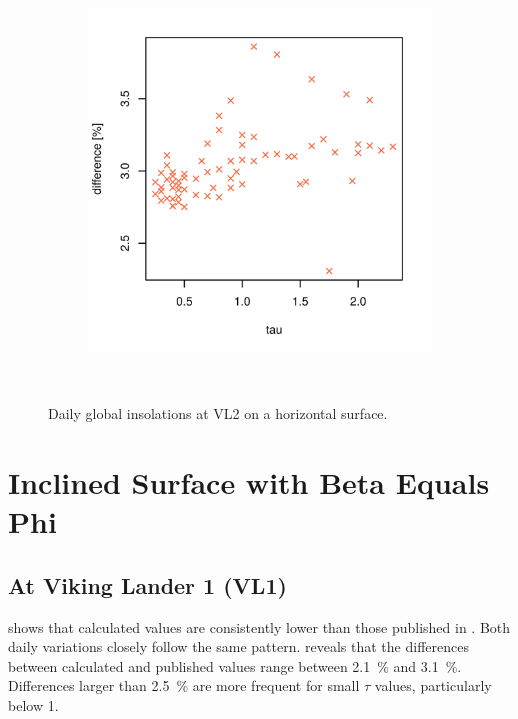 \begin{figure}[h]
\begin{subfigure}[t]{\subfigureWidth}
            \includegraphics[height=\graphicsHeight]{sections/appendix/insolation-calculation-verification/plots/hh-diff-bet-exp-calc-at-vl2.png}
            \label{fig:sub:comparative-global-insolation-at-vl2-horizontal-percentage-differences}
    \end{subfigure}\\[0.8ex]
    \caption[Daily global insolations at Viking Lander 2 on a horizontal surface]
    {Daily global insolations at \ac{VL2} on a horizontal surface.}
    \label{fig:plot:comparative-global-insolation-at-vl2-horizontal}
\vspace{-2ex}
\end{figure}

\section{Inclined Surface with Beta Equals Phi}
\subsection{At Viking Lander 1 (VL1)}
 shows that calculated values are consistently lower than those published in . Both daily variations closely follow the same pattern.  reveals that the differences between calculated and published values range between \SI{2.1}{\percent} and \SI{3.1}{\percent}. Differences larger than \SI{2.5}{\percent} are more frequent for small $\tau$ values, particularly below 1.

